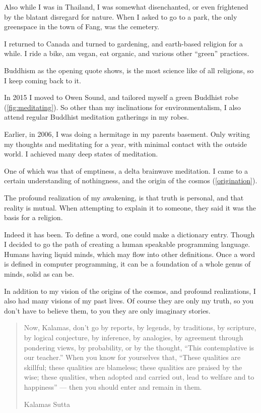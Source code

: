 Also while I was in Thailand, I was somewhat disenchanted, or even frightened by
the blatant disregard for nature. When I asked to go to a park, the only
greenspace in the town of Fang, was the cemetery. 

I returned to Canada and turned to gardening, and earth-based religion for a
while. I ride a bike, am vegan, eat organic, and various other ``green''
practices.

Buddhism as the opening quote shows, is the most science like of all religions,
so I keep coming back to it. 

In 2015 I moved to Owen Sound, and tailored myself a green Buddhist
robe (\ref{fig:meditating}). So
other than my inclinations for environmentalism, I also attend regular Buddhist
meditation gatherings in my robes.

Earlier, in 2006, I was doing a hermitage in my parents basement. Only writing
my thoughts and meditating for a year, with minimal contact with the outside
world. I achieved many deep states of meditation.  

One of which was that of emptiness, a delta brainwave meditation. 
I came to a certain understanding of nothingness, and the origin of the
cosmos (\ref{origination}).

The profound realization of my awakening, is that truth is personal, and that
reality is mutual. When attempting to explain it to someone, they said it was
the basis for a religion. 

Indeed it has been. To define a word, one could make a dictionary entry. Though
I decided to go the path of creating a human speakable programming language.
Humans having liquid minds, which  may flow into other definitions. Once a word
is defined in computer programming, it can be a foundation of a whole genus of
minds, solid as can be.  

In addition to my vision of the origins of the cosmos, and profound
realizations, I also had many visions of my past lives. Of course they are only
my truth, so you don't have to believe them, to you they are only imaginary
stories. 


\blockquote[Kalamas Sutta\cite{kalamas}]{Now, Kalamas, don't go by reports, by legends, by traditions, 
by scripture, by logical conjecture, by inference, by analogies, by agreement 
through pondering views, by probability, or by the thought, ``This contemplative
 is our teacher.'' When you know for yourselves that, ``These qualities are 
skillful; these qualities are blameless; these qualities are praised by the 
wise; these qualities, when adopted and carried out, lead to welfare and 
to happiness'' — then you should enter and remain in them.
}

